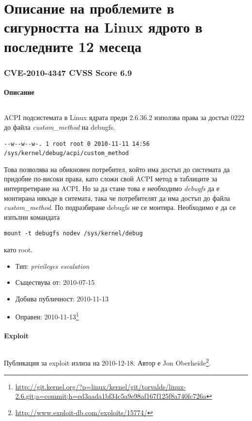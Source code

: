 \documentclass[a4paper,12pt,leqno]{article}
\begin{document}
\newpage
\part{Описание на проблемите в сигурността на Linux ядрото в последните 12 месеца}
\section{CVE-2010-4347 CVSS Score 6.9}
\subsection{Описание}
\paragraph{}
ACPI подсистемата в Linux ядрата преди 2.6.36.2 използва права за достъп 0222 до файла \textit{custom\_method} на debugfs.
\begin{verbatim}
--w--w--w-. 1 root root 0 2010-11-11 14:56 /sys/kernel/debug/acpi/custom_method
\end{verbatim}
Това позволява на обикновен потребител, който има достъп до системата да придобие по-високи права, като сложи свой ACPI метод в таблиците за интерпретиране на ACPI. Но за да стане това е необходимо \textit{debugfs} да е монтирана някъде в ситемата, така че потребителят да има достъп до файла \textit{custom\_method}. По подразбиране debugfs не се монтира. Необходимо е да се изпълни командата
\begin{verbatim}
mount -t debugfs nodev /sys/kernel/debug
\end{verbatim}
като root.

\begin{itemize}
    \item Тип: \textit{privileges escalation}
    \item Съществува от: 2010-07-15
  	\item Добива публичност: 2010-11-13
    \item Оправен: 2010-11-13\footnote{\url{http://git.kernel.org/?p=linux/kernel/git/torvalds/linux-2.6.git;a=commit;h=ed3aada1bf34c5a9e98af167f125f8a740fc726a}}
\end{itemize}

\subsection{Exploit}
\paragraph{}
Публикация за exploit излиза на 2010-12-18. Автор е Jon Oberheide\footnote{\url{http://www.exploit-db.com/exploits/15774/}}.
\end{document}
